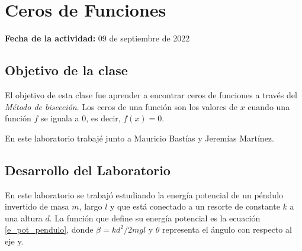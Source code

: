 \documentclass[../portafolio.tex]{subfiles}
\begin{document}


\section{Ceros de Funciones}   %

\hfill \textbf{Fecha de la actividad:} 09 de septiembre de 2022

\medskip


\subsection{Objetivo de la clase}
El objetivo de esta clase fue aprender a encontrar ceros de funciones a través del \textit{Método de bisección}. Los ceros de una función son los valores de $x$ cuando una función $f$ se iguala a 0, es decir, $f(x)=0$.

En este laboratorio trabajé junto a Mauricio Bastías y Jeremías Martínez.

\subsection{Desarrollo del Laboratorio}

En este laboratorio se trabajó estudiando la energía potencial de un péndulo invertido de masa $m$, largo $l$ y que está conectado a un resorte de constante $k$ a una altura $d$. La función que define su energía potencial es la ecuación \ref{e_pot_pendulo}, donde $\beta= kd^2/2mgl$ y $\theta$ representa el ángulo con respecto al eje y.
\end{document}
